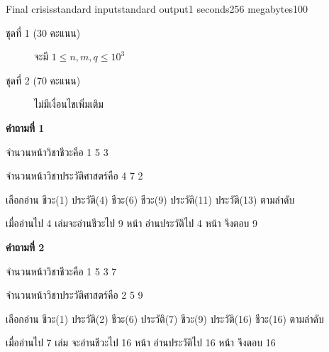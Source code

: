 \documentclass[11pt,a4paper]{article}
\begin{document}
\begin{problem}{Final crisis}{standard input}{standard output}{1 seconds}{256 megabytes}{100}
  \begin{description}
   
  \item[ชุดที่ 1 (30 คะแนน)] จะมี $ 1\leq n,m,q\leq10^3$
   
  \item[ชุดที่ 2 (70 คะแนน)] ไม่มีเงื่อนไขเพิ่มเติม
   
  \end{description}
   
  \Examples
   
  \begin{example}
  \end{example}
   
  \Note
  \begin{note}
  \textbf{คำถามที่ 1}
   
  จำนวนหน้าวิชาชีวะคือ 1 5 3
   
  จำนวนหน้าวิชาประวัติศาสตร์คือ 4 7 2
   
  เลือกอ่าน ชีวะ(1) ประวัติ(4) ชีวะ(6) ชีวะ(9) ประวัติ(11) ประวัติ(13) ตามลำดับ
   
  เมื่ออ่านไป 4 เล่มจะอ่านชีวะไป 9 หน้า อ่านประวัติไป 4 หน้า จึงตอบ 9
   
  \textbf{คำถามที่ 2}
   
  จำนวนหน้าวิชาชีวะคือ 1 5 3 7
   
  จำนวนหน้าวิชาประวัติศาสตร์คือ 2 5 9
   
  เลือกอ่าน ชีวะ(1) ประวัติ(2) ชีวะ(6) ประวัติ(7) ชีวะ(9) ประวัติ(16) ชีวะ(16) ตามลำดับ
   
  เมื่ออ่านไป 7 เล่ม จะอ่านชีวะไป 16 หน้า อ่านประวัติไป 16 หน้า จึงตอบ 16
  \end{note}
   
   
  \end{problem}

\pagebreak
\end{document}
